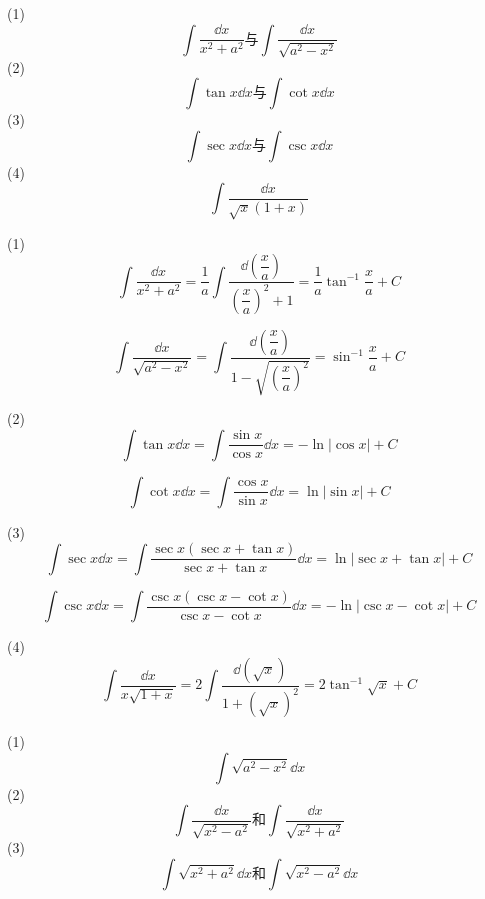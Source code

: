 \begin{problem}
	(1)$$\int\frac{\dd x}{x^2+a^2}\text{与}\int \frac{\dd x}{\sqrt{a^2-x^2}}$$
	(2)$$\int\tan x\dd x\text{与}\int\cot x\dd x$$
	(3)$$\int\sec x\dd x\text{与}\int\csc x\dd x$$
	(4)$$\int\frac{\dd x}{\sqrt{x}(1+x)}$$
\end{problem}
\begin{solution}
	(1)
	\[
	\int \frac{\dd x}{x^2 + a^2} = \frac{1}{a} \int \frac{\dd\left(\dfrac{x}{a}\right)}{\left(\dfrac{x}{a}\right)^2 + 1} = \frac{1}{a} \tan^{-1} \frac{x}{a} + C
	\]
	
	\[
	\int \frac{\dd x}{\sqrt{a^2-x^2}} = \int \frac{\dd\left(\dfrac{x}{a}\right)}{1 - \sqrt{\left(\dfrac{x}{a}\right)^2}} = \sin^{-1} \dfrac{x}{a} + C
	\]
	
	(2)
	\[
	\int \tan x \dd x = \int \frac{\sin x}{\cos x} \dd x = -\ln |\cos x| + C
	\]
	
	\[
	\int \cot x \dd x = \int \frac{\cos x}{\sin x} \dd x = \ln |\sin x| + C
	\]
	
	(3)
	\[
	\int \sec x \dd x = \int \frac{\sec x (\sec x + \tan x)}{\sec x + \tan x} \dd x = \ln |\sec x + \tan x| + C
	\]
	
	\[
	\int \csc x \dd x = \int \frac{\csc x (\csc x - \cot x)}{\csc x - \cot x} \dd x = -\ln |\csc x - \cot x| + C
	\]
	
	(4)
	\[
	\int \frac{\dd x}{x \sqrt{1 + x}} = 2 \int \frac{\dd(\sqrt{x})}{1 + (\sqrt{x})^2} = 2 \tan^{-1} \sqrt{x} + C
	\]
\end{solution}
\begin{problem}
	(1)\[\int \sqrt{a^2-x^2}\dd x\]
	(2)\[\int\frac{\dd x}{\sqrt{x^2-a^2}}\text{和}\int\frac{\dd x}{\sqrt{x^2+a^2}}\]
	(3)\[\int \sqrt{x^2+a^2}\dd x\text{和}\int \sqrt{x^2-a^2}\dd x\]
\end{problem}
